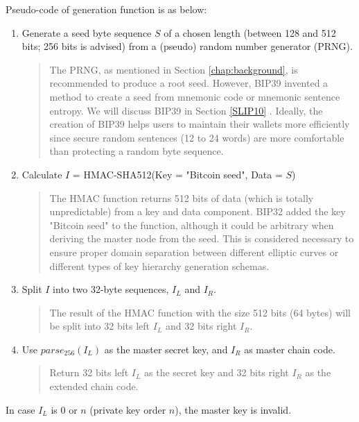 Pseudo-code of generation function is as below:

\begin{enumerate}
    \item Generate a seed byte sequence $S$ of a chosen length (between 128 and 512 bits; 256 bits is advised) from a (pseudo) random number generator (PRNG).

          \begin{quote}
              The PRNG, as mentioned in Section \ref{chap:background}, is recommended to produce a root seed. However, BIP39 \cite{github/bip0039} invented a method to create a seed from mnemonic code or mnemonic sentence entropy. We will discuss BIP39 in Section \ref{SLIP10} . Ideally, the creation of BIP39 helps users to maintain their wallets more efficiently since secure random sentences (12 to 24 words) are more comfortable than protecting a random byte sequence.
          \end{quote}

    \item Calculate $I$ = HMAC-SHA512(Key = "Bitcoin seed", Data = $S$)
          \begin{quote}
              The HMAC function returns 512 bits of data (which is totally unpredictable) from a key and data component. BIP32 added the key "Bitcoin seed" to the function, although it could be arbitrary when deriving the master node from the seed. This is considered necessary to ensure proper domain separation between different elliptic curves or different types of key hierarchy generation schemas.
          \end{quote}

    \item Split $I$ into two 32-byte sequences, $I_L$ and $I_R$.

          \begin{quote}
              The result of the HMAC function with the size 512 bits (64 bytes) will be split into 32 bits left  $I_L$ and 32 bits right $I_R$.
          \end{quote}
    \item Use $parse_{256}(I_L)$ as the master secret key, and $I_R$ as master chain code.

          \begin{quote}
              Return 32 bits left $I_L$ as the secret key and 32 bits right $I_R$ as the extended chain code.
          \end{quote}

\end{enumerate}
In case $I_L$ is 0 or $n$ (private key  order $n$), the master key is invalid.

